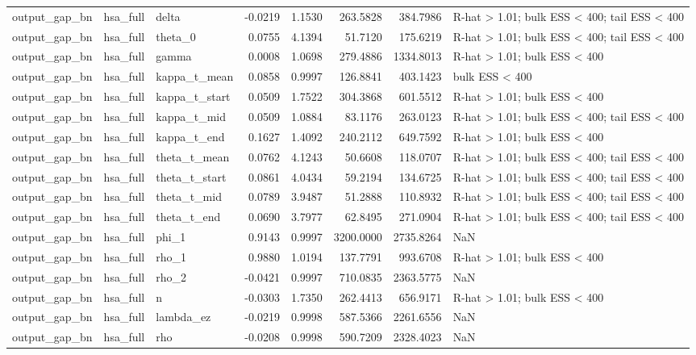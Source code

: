 \begin{tabular}{lllrrrrl}
output\_gap\_bn & hsa\_full & delta & -0.0219 & 1.1530 & 263.5828 & 384.7986 & R-hat > 1.01; bulk ESS < 400; tail ESS < 400 \\
output\_gap\_bn & hsa\_full & theta\_0 & 0.0755 & 4.1394 & 51.7120 & 175.6219 & R-hat > 1.01; bulk ESS < 400; tail ESS < 400 \\
output\_gap\_bn & hsa\_full & gamma & 0.0008 & 1.0698 & 279.4886 & 1334.8013 & R-hat > 1.01; bulk ESS < 400 \\
output\_gap\_bn & hsa\_full & kappa\_t\_mean & 0.0858 & 0.9997 & 126.8841 & 403.1423 & bulk ESS < 400 \\
output\_gap\_bn & hsa\_full & kappa\_t\_start & 0.0509 & 1.7522 & 304.3868 & 601.5512 & R-hat > 1.01; bulk ESS < 400 \\
output\_gap\_bn & hsa\_full & kappa\_t\_mid & 0.0509 & 1.0884 & 83.1176 & 263.0123 & R-hat > 1.01; bulk ESS < 400; tail ESS < 400 \\
output\_gap\_bn & hsa\_full & kappa\_t\_end & 0.1627 & 1.4092 & 240.2112 & 649.7592 & R-hat > 1.01; bulk ESS < 400 \\
output\_gap\_bn & hsa\_full & theta\_t\_mean & 0.0762 & 4.1243 & 50.6608 & 118.0707 & R-hat > 1.01; bulk ESS < 400; tail ESS < 400 \\
output\_gap\_bn & hsa\_full & theta\_t\_start & 0.0861 & 4.0434 & 59.2194 & 134.6725 & R-hat > 1.01; bulk ESS < 400; tail ESS < 400 \\
output\_gap\_bn & hsa\_full & theta\_t\_mid & 0.0789 & 3.9487 & 51.2888 & 110.8932 & R-hat > 1.01; bulk ESS < 400; tail ESS < 400 \\
output\_gap\_bn & hsa\_full & theta\_t\_end & 0.0690 & 3.7977 & 62.8495 & 271.0904 & R-hat > 1.01; bulk ESS < 400; tail ESS < 400 \\
output\_gap\_bn & hsa\_full & phi\_1 & 0.9143 & 0.9997 & 3200.0000 & 2735.8264 & NaN \\
output\_gap\_bn & hsa\_full & rho\_1 & 0.9880 & 1.0194 & 137.7791 & 993.6708 & R-hat > 1.01; bulk ESS < 400 \\
output\_gap\_bn & hsa\_full & rho\_2 & -0.0421 & 0.9997 & 710.0835 & 2363.5775 & NaN \\
output\_gap\_bn & hsa\_full & n & -0.0303 & 1.7350 & 262.4413 & 656.9171 & R-hat > 1.01; bulk ESS < 400 \\
output\_gap\_bn & hsa\_full & lambda\_ez & -0.0219 & 0.9998 & 587.5366 & 2261.6556 & NaN \\
output\_gap\_bn & hsa\_full & rho & -0.0208 & 0.9998 & 590.7209 & 2328.4023 & NaN \\

\end{tabular}
